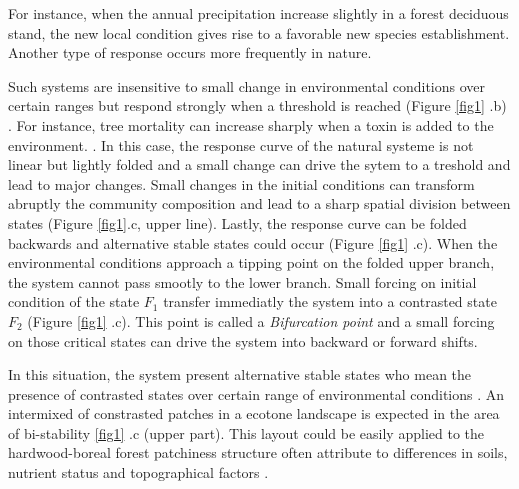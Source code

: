 For instance, when the annual precipitation increase slightly in a forest
deciduous stand, the new local condition gives rise to a favorable new species
establishment. Another type of response
occurs more frequently in nature.

Such systems are insensitive to small change in environmental conditions over
certain ranges but respond strongly when a threshold is reached (Figure
\ref{fig1} .b) \cite{scheffer2009critical}. For instance, tree mortality can
increase sharply when a toxin is added to the environment.
\cite{scheffer2009critical}. In this case, the response curve of the natural
systeme is not linear but lightly folded and a small change can drive the
sytem to a treshold and lead to major changes. Small changes in the initial
conditions can transform abruptly the community composition and lead to a
sharp spatial division between states (Figure \ref{fig1}.c, upper line). Lastly, the
response curve can be folded backwards and alternative stable states could
occur (Figure \ref{fig1} .c).  When the environmental conditions approach a
tipping point on the folded upper branch, the system cannot pass smootly to
the lower branch. Small forcing on initial condition of the state $F_1$
transfer immediatly the system into a contrasted state $F_2$ (Figure
\ref{fig1} .c). This point is called a \textit{Bifurcation point} and a small
forcing on those critical states can drive the system into backward or forward
shifts.


In this situation, the system present alternative stable states who mean the
presence of contrasted states over certain range of environmental conditions
\cite{scheffer2009critical}. An intermixed of constrasted patches in a ecotone
landscape is expected in the area of bi-stability \ref{fig1} .c (upper part).
This layout could be easily applied to the hardwood-boreal forest patchiness
structure often attribute to differences in soils, nutrient status and
topographical factors \cite{Society2014}.\\


